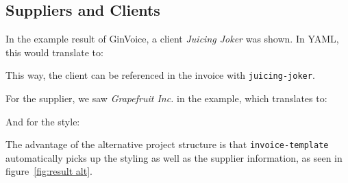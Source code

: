 \subsection{Suppliers and Clients}\label{sec:supplier and client}
In the example result of GinVoice, a client \textit{Juicing Joker} was shown.
In YAML, this would translate to:


This way, the client can be referenced in the invoice with \texttt{juicing-joker}.

For the supplier, we saw \textit{Grapefruit Inc.} in the example, which translates to:


And for the style:


The advantage of the alternative project structure is that \texttt{invoice-template} automatically picks up the styling as well as the supplier information, as seen in figure~\ref{fig:result alt}.

\onecolumn
